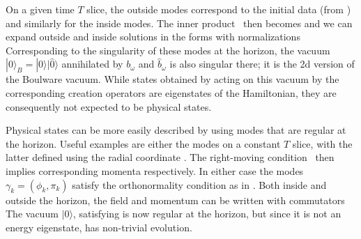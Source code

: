 On a given time $T$ slice, the outside modes correspond to the initial data (from \RMp)
%
\eqn{}
%
and similarly for the inside modes.
The inner product \normdef\ then becomes
%
\eqn{}
%
and we can expand outside and inside solutions in the forms
%
\eqn{}
%
 with normalizations
%
\eqn{}
%
Corresponding to the singularity of these modes at the horizon, the vacuum $|0\rangle_B=|0\rangle|\hat 0\rangle$ annihilated by $b_\omega$ and $\hat b_\omega$ is also singular there; it is the 2d version of the Boulware vacuum.  While states obtained by acting on this vacuum by the corresponding creation operators are eigenstates of the Hamiltonian, they are consequently  not expected to be physical states.


Physical states can be more easily described by using modes that are regular at the horizon.  Useful examples are either the modes 
%
\eqn{}
%
on a constant $T$ slice, with the latter defined using the radial coordinate \rhodef.  The right-moving condition \RMp\ then implies corresponding momenta
%
\eqn{}
%
respectively.  In either case the modes $\gamma_k=(\phi_k,\pi_k)$ satisfy the orthonormality condition
%
\eqn{}
%
as in \omprod. Both inside and outside the horizon, the field and momentum can be written
%
\eqn{}
%
with commutators
%
\eqn{}
%
The vacuum $|0\rangle$, satisfying
%
\eqn{}
%
is now regular at the horizon, but since it is not an energy eigenstate, has non-trivial evolution.


